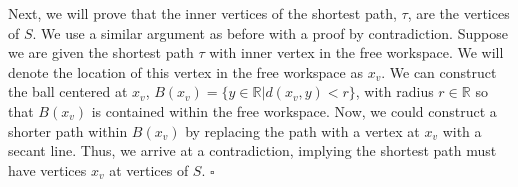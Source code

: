 \documentclass[11pt]{article}
\begin{document}
\begin{enumerate}[leftmargin=0.3in]
\begin{enumerate}
      Next, we will prove that the inner vertices of the shortest path, $\tau$, are the vertices of $S$. We use a similar argument as before with a proof by contradiction. Suppose we are given the shortest path $\tau$ with inner vertex in the free workspace. We will denote the location of this vertex in the free workspace as $x_v$. We can construct the ball centered at $x_v$, $B(x_v) = \{y \in \mathbb{R} | d(x_v, y) < r\}$, with radius $r \in \mathbb{R}$ so that $B(x_v)$ is contained within the free workspace. Now, we could construct a shorter path within $B(x_v)$ by replacing the path with a vertex at $x_v$ with a secant line. Thus, we arrive at a contradiction, implying the shortest path must have vertices $x_v$ at vertices of $S$. $\square$ \break
  \end{enumerate}

\end{enumerate}
\end{document}
